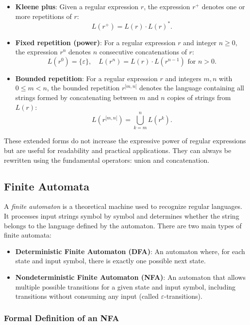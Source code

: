 \begin{itemize}
    \item \textbf{Kleene plus}: Given a regular expression $r$, the expression $r^+$ denotes one or more repetitions of $r$:
    \[
    L(r^+) = L(r) \cdot L(r)^*.
    \]

    \item \textbf{Fixed repetition (power)}: For a regular expression $r$ and integer $n \geq 0$, the expression $r^n$ denotes $n$ consecutive concatenations of $r$:
    \[
    L(r^0) = \{ \varepsilon \}, \quad L(r^n) = L(r) \cdot L(r^{n-1}) \text{ for } n > 0.
    \]

	 \item \textbf{Bounded repetition}: For a regular expression $r$ and integers $m, n$ with $0 \leq m < n$, the bounded repetition $r^{[m,n[}$ denotes the language containing all strings formed by concatenating between $m$ and $n$ copies of strings from $L(r)$:
    \[
    L(r^{[m,n[}) = \bigcup_{k=m}^{n} L(r^k).
    \]
\end{itemize}

These extended forms do not increase the expressive power of regular expressions but are useful for readability and practical applications. They can always be rewritten using the fundamental operators: union and concatenation.

\subsection{Finite Automata}

A \emph{finite automaton} is a theoretical machine used to recognize regular languages. It processes input strings symbol by symbol and determines whether the string belongs to the language defined by the automaton. There are two main types of finite automata:

\begin{itemize}
    \item \textbf{Deterministic Finite Automaton (DFA)}: An automaton where, for each state and input symbol, there is exactly one possible next state.
    \item \textbf{Nondeterministic Finite Automaton (NFA)}: An automaton that allows multiple possible transitions for a given state and input symbol, including transitions without consuming any input (called $\varepsilon$-transitions).
\end{itemize}

\subsubsection*{Formal Definition of an NFA}

